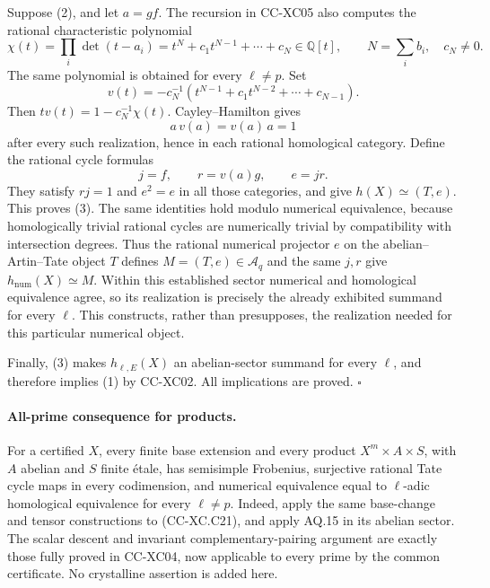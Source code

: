 Suppose (2), and let \(a=gf\).  The recursion in CC-XC05
also computes the rational characteristic polynomial
\[
 \chi(t)=\prod_i\det(t-a_i)
        =t^N+c_1t^{N-1}+\cdots+c_N\in\mathbb Q[t],
        \qquad N=\sum_i b_i,\quad c_N\ne0.
 \]
The same polynomial is obtained for every \(\ell\ne p\).
Set
\[
 v(t)=-c_N^{-1}
        (t^{N-1}+c_1t^{N-2}+\cdots+c_{N-1}).
 \]
Then \(t v(t)=1-c_N^{-1}\chi(t)\).
Cayley--Hamilton gives
\[
                       a\,v(a)=v(a)\,a=1
                                                        \tag{CC-XC.C20}
\]
after every such realization, hence in each rational
homological category.  Define the rational cycle
formulas
\[
                         j=f,\qquad r=v(a)g,\qquad e=jr.
                                                        \tag{CC-XC.C21}
\]
They satisfy \(rj=1\) and \(e^2=e\) in all those categories,
and give \(h(X)\simeq(T,e)\).  This proves (3).
The same identities hold modulo numerical equivalence,
because homologically trivial rational cycles are
numerically trivial by compatibility with intersection
degrees.  Thus the rational numerical projector \(e\)
on the abelian--Artin--Tate object \(T\) defines
\(M=(T,e)\in\mathcal A_q\) and the same \(j,r\)
give \(h_{\mathrm{num}}(X)\simeq M\).
Within this established sector numerical and homological
equivalence agree, so its realization is precisely the
already exhibited summand for every \(\ell\).
This constructs, rather than presupposes, the realization
needed for this particular numerical object.

Finally, (3) makes \(h_{\ell,E}(X)\) an abelian-sector
summand for every \(\ell\), and therefore implies (1)
by CC-XC02.  All implications are proved. \(\square\)

\paragraph{All-prime consequence for products.}
For a certified \(X\), every finite base extension and
every product \(X^m\times A\times S\), with \(A\) abelian
and \(S\) finite étale, has semisimple Frobenius,
surjective rational Tate cycle maps in every codimension,
and numerical equivalence equal to \(\ell\)-adic
homological equivalence for every \(\ell\ne p\).
Indeed, apply the same base-change and tensor constructions
to (CC-XC.C21), and apply AQ.15 in its abelian sector.
The scalar descent and invariant complementary-pairing
argument are exactly those fully proved in CC-XC04,
now applicable to every prime by the common certificate.
No crystalline assertion is added here.

